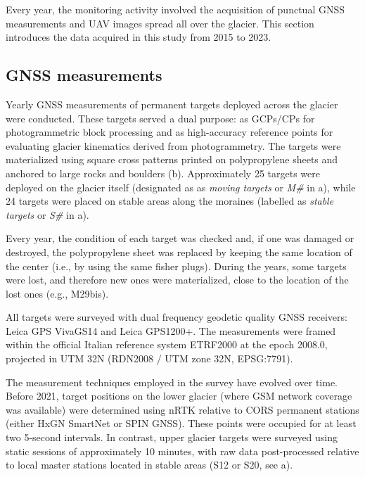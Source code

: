 Every year, the monitoring activity involved the acquisition of punctual GNSS measurements 
and UAV images spread all over the glacier. 
This section introduces the data acquired in this study from 2015 to 2023.

\subsection{GNSS measurements}\label{sec:3:gnss}

Yearly GNSS measurements of permanent targets deployed across the glacier were conducted. 
These targets served a dual purpose: as GCPs/CPs for photogrammetric block processing and as high-accuracy 
reference points for evaluating glacier kinematics derived from photogrammetry. 
The targets were materialized using square cross patterns printed on polypropylene sheets and anchored to 
large rocks and boulders (b).
Approximately 25 targets were deployed on the glacier itself (designated as as \textit{moving targets} or 
\textit{M\#} in a), while 24 targets were placed on stable areas along the moraines 
(labelled as \textit{stable targets} or \textit{S\#} in a). 

Every year, the condition of each target was checked and, if one was damaged or
destroyed, the polypropylene sheet was replaced by keeping the same location of the
center (i.e., by using the same fisher plugs). 
During the years, some targets were lost, and therefore new ones were materialized, close 
to the location of the lost ones (e.g., M29bis).

All targets were surveyed with dual frequency geodetic quality GNSS receivers: 
Leica GPS VivaGS14 and Leica GPS1200+.
The measurements were framed within the official Italian reference system ETRF2000
at the epoch 2008.0, projected in UTM 32N (RDN2008 / UTM zone 32N, EPSG:7791).

The measurement techniques employed in the survey have evolved over time.
Before 2021, target positions on the lower glacier (where GSM network coverage was available) 
were determined using nRTK relative to CORS permanent stations (either HxGN SmartNet or SPIN GNSS).
These points were occupied for at least two 5-second intervals. 
In contrast, upper glacier targets were surveyed using static sessions of approximately 10 
minutes, with raw data post-processed relative to local master stations located in stable areas 
(S12 or S20, see a).

